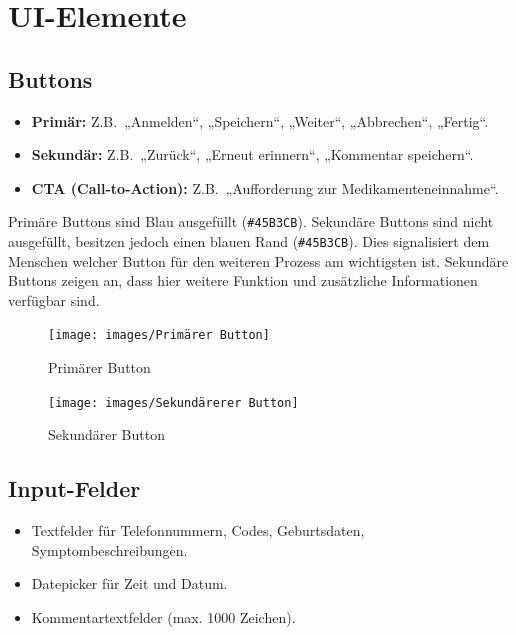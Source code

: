 \section{UI-Elemente}
\subsection{Buttons}
\begin{itemize}
	\item \textbf{Primär:} Z.B.\ „Anmelden“, „Speichern“, „Weiter“, „Abbrechen“, „Fertig“.
	\item \textbf{Sekundär:} Z.B.\ „Zurück“, „Erneut erinnern“, „Kommentar speichern“.
	\item \textbf{CTA (Call-to-Action):} Z.B.\ „Aufforderung zur Medikamenteneinnahme“.
\end{itemize}

Primäre Buttons sind Blau ausgefüllt (\texttt{\#45B3CB}). Sekundäre Buttons sind nicht ausgefüllt, besitzen jedoch einen blauen Rand (\texttt{\#45B3CB}). Dies signalisiert dem Menschen welcher Button für den weiteren Prozess am wichtigsten ist. Sekundäre Buttons zeigen an, dass hier weitere Funktion und zusätzliche Informationen verfügbar sind.

\begin{figure}[h!]
	\centering
	\begin{minipage}{0.45\linewidth}
		\centering
		\texttt{[image: images/Primärer Button]}
		\caption{Primärer Button}
		\label{fig:primarer-button}
	\end{minipage}
	\hfill
	\begin{minipage}{0.45\linewidth}
		\centering
		\texttt{[image: images/Sekundärerer Button]}
		\caption{Sekundärer Button}
		\label{fig:sekundarerer-button}
	\end{minipage}
\end{figure}

\subsection{Input-Felder}
\begin{itemize}
	\item Textfelder für Telefonnummern, Codes, Geburtsdaten, Symptombeschreibungen.
	\item Datepicker für Zeit und Datum.
	\item Kommentartextfelder (max. 1000 Zeichen).
\end{itemize}

\vspace{-2.5em}

